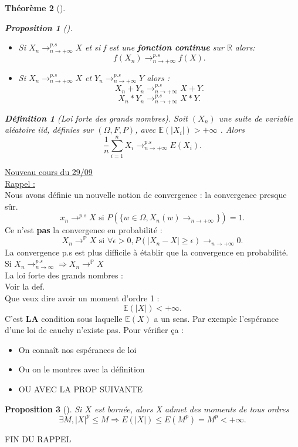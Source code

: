 \documentclass{article}
\theoremstyle{plain}%
\newtheorem{thm}{Théorème}[section]
\newtheorem{prop}[thm]{Proposition}
\theoremstyle{definition}
\newtheorem{defn}{Définition}[section]
\theoremstyle{remark}
\begin{document}
\begin{thm}[]
    \begin{prop}[]
        \begin{itemize}
            \item Si $ X_n \to^{p.s}_{n \to +\infty} X $ et si f est une \textbf{fonction continue} sur $ \mathbb{R} $  alors:
            \[
                f(X_n) \to^{p.s}_{n \to +\infty} f(X)
            .\]
            \item Si $ X_n \to^{p.s}_{n \to +\infty} X $ et $ Y_n \to^{p.s}_{n \to +\infty}Y $ alors : 
            \[
                X_n + Y_n \to^{p.s}_{n \to +\infty} X+Y
            .\]
            \[
                X_n * Y_n \to^{p.s}_{n \to +\infty} X*Y
            .\]
        \end{itemize}
    \end{prop}
    
    

    \begin{defn}[Loi forte des grands nombres]
        Soit $ (X_n) $ une suite de variable aléatoire iid, définies sur $ (\Omega , F, P) $, avec $ \mathbb{E}(\left| X_i \right| ) > + \infty  $ . Alors 
        \[
            \frac{1}{n} \sum_{i=1}^{n}X_i \to_{n \to + \infty }^{p.s} E(X_i)
        .\]
        
    \end{defn}

\end{thm}

\underline{Nouveau cours du 29/09} \\
\underline{Rappel : } \\
Nous avons définie un nouvelle notion de convergence : la convergence presque sûr. 
\[
    x_n \to ^{p.s} X \text{ si } P (\{w \in \Omega , X_n(w) \to_{n \to +\infty }\}) = 1
.\]
Ce n'est \textbf{pas} la convergence en probabilité : 
\[
    X_n \to ^{\mathbb{P}} X \text{ si } \forall \epsilon > 0, P(\left| X_n - X \right| \geq  \epsilon ) \to _{n \to +\infty } 0
.\]
La convergence p.s est plus difficile à établir que la convergence en probabilité.\\
Si $ X_n \to ^{p.s}_{n \to \infty } \Rightarrow X_n \to ^{\mathbb{P}} X$  \\

La loi forte des grands nombres : \\
Voir la def. \\
Que veux dire avoir un moment d'ordre 1 : 
\[
    \mathbb{E}(\left| X \right| ) < +\infty 
.\]
C'est \textbf{LA} condition sous laquelle $ \mathbb{E}(X) $ a un sens. Par exemple l'espérance d'une loi de cauchy n'existe pas. Pour vérifier ça : \begin{itemize}
    \item On connaît nos espérances de loi
    \item Ou on le montres avec la définition
    \item OU AVEC LA PROP SUIVANTE
\end{itemize}
\begin{prop}[]
    Si $ X $ est bornée, alors X admet des moments de tous ordres 
    \[
        \exists M, \left| X \right|^p \leq M \Rightarrow E(\left| X \right| ) \leq E(M^p) = M ^p< + \infty 
    .\]
\end{prop}
FIN DU RAPPEL
\end{document}
